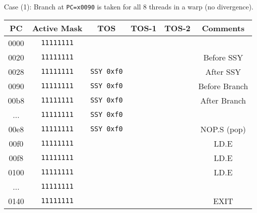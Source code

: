 \documentclass[11pt]{article}
\begin{document}
Case (1): Branch at \verb|PC=x0090| is taken for all 8 threads in a warp (no divergence).\\

\begin{table}[H]
    \centering %
    \begin{tabular}{c c c c c c} %
    \hline\hline %
    PC & Active Mask & TOS & TOS-1 & TOS-2 & Comments \\ [0.5ex] %
    \hline %
    0000 & \verb|11111111| & & & & \\
    0020 & \verb|11111111| & & & & Before SSY \\
    0028 & \verb|11111111| & \verb|SSY 0xf0| & & & After SSY \\
    0090 & \verb|11111111| & \verb|SSY 0xf0| & & & Before Branch \\
    00b8 & \verb|11111111| & \verb|SSY 0xf0| & & & After Branch \\
    ...  & \verb|11111111| & \verb|SSY 0xf0| & & & \\ 
    00e8 & \verb|11111111| & \verb|SSY 0xf0| & & & NOP.S (pop)\\
    00f0 & \verb|11111111| & & & & LD.E \\
    00f8 & \verb|11111111| & & & & LD.E \\
    0100 & \verb|11111111| & & & & LD.E \\
    ...  & \verb|11111111| & & & & \\
    0140 & \verb|11111111| & & & & EXIT \\

\hline %
\end{tabular}
\label{table:nonlin} %
\end{table}
\end{document}
